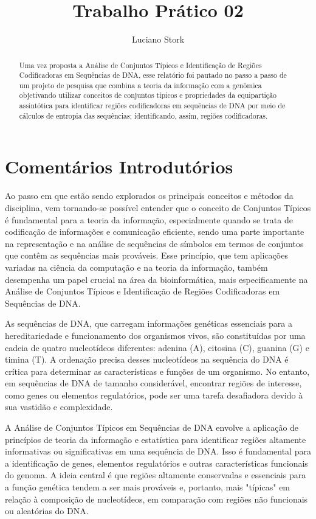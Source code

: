 \documentclass{article}
\title{Trabalho Prático 02}
\author{Luciano Stork}
\begin{document}
\maketitle

\begin{abstract}
Uma vez proposta a Análise de Conjuntos Típicos e Identificação de Regiões Codificadoras em Sequências de DNA, esse relatório foi pautado no passo a passo de um projeto de pesquisa que combina a teoria da informação com a genômica objetivando utilizar conceitos de conjuntos típicos e propriedades da equipartição assintótica para identificar regiões codificadoras em sequências de DNA por meio de cálculos de entropia das sequências; identificando, assim, regiões codificadoras.

\end{abstract}

\section{Comentários Introdutórios}

Ao passo em que estão sendo explorados os principais conceitos e métodos da disciplina, vem tornando-se possível entender que o conceito de Conjuntos Típicos é fundamental para a teoria da informação, especialmente quando se trata de codificação de informações e comunicação eficiente, sendo uma parte importante na representação e na análise de sequências de símbolos em termos de conjuntos que contêm as sequências mais prováveis. Esse princípio, que tem aplicações variadas na ciência da computação e na teoria da informação, também desempenha um papel crucial na área da bioinformática, mais especificamente na Análise de Conjuntos Típicos e Identificação de Regiões Codificadoras em Sequências de DNA.

As sequências de DNA, que carregam informações genéticas essenciais para a hereditariedade e funcionamento dos organismos vivos, são constituídas por uma cadeia de quatro nucleotídeos diferentes: adenina (A), citosina (C), guanina (G) e timina (T). A ordenação precisa desses nucleotídeos na sequência do DNA é crítica para determinar as características e funções de um organismo. No entanto, em sequências de DNA de tamanho considerável, encontrar regiões de interesse, como genes ou elementos regulatórios, pode ser uma tarefa desafiadora devido à sua vastidão e complexidade.

A Análise de Conjuntos Típicos em Sequências de DNA envolve a aplicação de princípios de teoria da informação e estatística para identificar regiões altamente informativas ou significativas em uma sequência de DNA. Isso é fundamental para a identificação de genes, elementos regulatórios e outras características funcionais do genoma. A ideia central é que regiões altamente conservadas e essenciais para a função genética tendem a ser mais prováveis e, portanto, mais "típicas" em relação à composição de nucleotídeos, em comparação com regiões não funcionais ou aleatórias do DNA.
\end{document}
